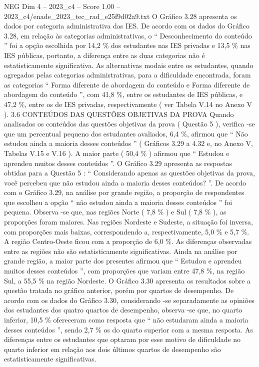 \begin{textsample}{NEG Dim 4 – 2023\_c4 – Score 1.00 – 2023\_c4/enade\_2023\_tec\_rad\_e25f9d02a9.txt}
O Gráfico 3.28 apresenta os dados por categoria administrativa das IES.
De acordo com os dados do Gráfico 3.28, em relação às categorias administrativas, o “ Desconhecimento do conteúdo ” foi a opção escolhida por 14,2 \% dos estudantes nas IES privadas e 13,5 \% nas IES públicas, portanto, a diferença entre as duas categorias não é estatisticamente significativa.
As alternativas modais entre os estudantes, quando agregados pelas categorias administrativas, para a dificuldade encontrada, foram as categorias “ Forma diferente de abordagem do conteúdo e Forma diferente de abordagem do conteúdo ”, com 41,8 \%, entre os estudantes de IES públicas, e 47,2 \%, entre os de IES privadas, respectivamente ( ver Tabela V.14 no Anexo V ). 3.6 CONTEÚDOS DAS QUESTÕES OBJETIVAS DA PROVA Quando analisados os conteúdos das questões objetivas da prova ( Questão 5 ), verifica -se que um percentual pequeno dos estudantes avaliados, 6,4 \%, afirmou que “ Não estudou ainda a maioria desses conteúdos ” ( Gráficos 3.29 a 4.32 e, no Anexo V, Tabelas V.15 e V.16 ).
A maior parte ( 50,4 \% ) afirmou que “ Estudou e aprendeu muitos desses conteúdos ”.
O Gráfico 3.29 apresenta as respostas obtidas para a Questão 5 : “ Considerando apenas as questões objetivas da prova, você percebeu que não estudou ainda a maioria desses conteúdos? ”.
De acordo com o Gráfico 3.29, na análise por grande região, a proporção de respondentes que escolheu a opção “ não estudou ainda a maioria desses conteúdos ” foi pequena.
Observa -se que, nas regiões Norte ( 7,8 \% ) e Sul ( 7,8 \% ), as proporções foram maiores.
Nas regiões Nordeste e Sudeste, a situação foi inversa, com proporções mais baixas, correspondendo a, respectivamente, 5,0 \% e 5,7 \%.
A região Centro-Oeste ficou com a proporção de 6,0 \%.
As diferenças observadas entre as regiões não são estatisticamente significativas.
Ainda na análise por grande região, a maior parte dos presentes afirmou que “ Estudou e aprendeu muitos desses conteúdos ”, com proporções que variam entre 47,8 \%, na região Sul, a 55,5 \% na região Nordeste.
O Gráfico 3.30 apresenta os resultados sobre a questão tratada no gráfico anterior, porém por quartos de desempenho.
De acordo com os dados do Gráfico 3.30, considerando -se separadamente as opiniões dos estudantes dos quatro quartos de desempenho, observa -se que, no quarto inferior, 10,5 \% ofereceram como resposta que “ não estudaram ainda a maioria desses conteúdos ”, sendo 2,7 \% os do quarto superior com a mesma resposta.
As diferenças entre os estudantes que optaram por esse motivo de dificuldade no quarto inferior em relação aos dois últimos quartos de desempenho são estatisticamente significativas.

\end{textsample}
